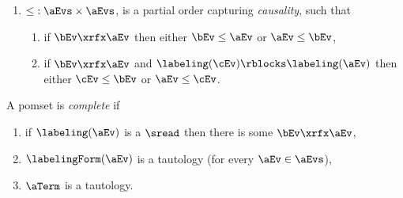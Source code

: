 \begin{definition}
\begin{enumerate}[,label=(\textsc{m}\arabic*),ref=\textsc{m}\arabic*]
\begin{enumerate}
    \end{enumerate}
  \item \label{pom-le} 
    ${\le} : \aEvs\times\aEvs$, is a partial order capturing
    \emph{causality}, such that
    \begin{enumerate}
    \item \label{pom-le-match}
      if $\bEv\xrfx\aEv$ then either $\bEv\le\aEv$ or $\aEv\le\bEv$,
    \item \label{pom-le-block}
      if $\bEv\xrfx\aEv$ and $\labeling(\cEv) \rblocks \labeling(\aEv)$ then either $\cEv\le\bEv$ or $\aEv\le\cEv$.
    \end{enumerate}
  \end{enumerate}
  A pomset is \emph{complete} if
  \begin{enumerate}[,label=(\textsc{c}\arabic*),ref=\textsc{c}\arabic*]
    \setcounter{enumi}{\value{Blambda}}
  \item \label{top-rf}
    if $\labeling(\aEv)$ is a $\sread$ then there is some $\bEv\xrfx\aEv$,
    \setcounter{enumi}{\value{Bkappa}}
  \item \label{top-kappa}
    $\labelingForm(\aEv)$ is a tautology (for every $\aEv\in\aEvs$),
    \setcounter{enumi}{\value{Bterm}}
  \item \label{top-term}
    $\aTerm$ is a tautology.
  \end{enumerate}
\end{definition}


